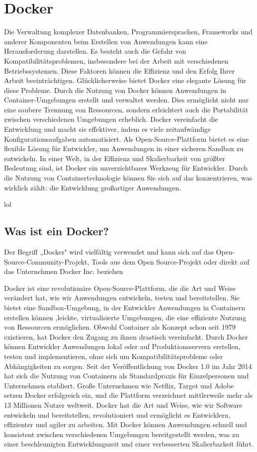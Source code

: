 \section{Docker}\label{Docker}

Die Verwaltung komplexer Datenbanken, Programmiersprachen, Frameworks und anderer Komponenten beim Erstellen von Anwendungen kann eine Herausforderung darstellen. Es besteht auch die Gefahr von Kompatibilitätsproblemen, insbesondere bei der Arbeit mit verschiedenen Betriebssystemen. Diese Faktoren können die Effizienz und den Erfolg Ihrer Arbeit beeinträchtigen.
Glücklicherweise bietet Docker eine elegante Lösung für diese Probleme. Durch die Nutzung von Docker können Anwendungen in Container-Umgebungen erstellt und verwaltet werden. Dies ermöglicht nicht nur eine saubere Trennung von Ressourcen, sondern erleichtert auch die Portabilität zwischen verschiedenen Umgebungen erheblich.
Docker vereinfacht die Entwicklung und macht sie effektiver, indem es viele zeitaufwändige Konfigurationsaufgaben automatisiert. Als Open-Source-Plattform bietet es eine flexible Lösung für Entwickler, um Anwendungen in einer sicheren Sandbox zu entwickeln.
In einer Welt, in der Effizienz und Skalierbarkeit von größter Bedeutung sind, ist Docker ein unverzichtbares Werkzeug für Entwickler. Durch die Nutzung von Containertechnologie können Sie sich auf das konzentrieren, was wirklich zählt: die Entwicklung großartiger Anwendungen.

lol
\subsection{Was ist ein Docker?}

Der Begriff „Docker" wird vielfältig verwendet und kann sich auf das Open-Source-Community-Projekt, Tools aus dem Open Source-Projekt oder direkt auf das Unternehmen Docker Inc. beziehen

Docker ist eine revolutionäre Open-Source-Plattform, die die Art und Weise verändert hat, wie wir Anwendungen entwickeln, testen und bereitstellen. Sie bietet eine Sandbox-Umgebung, in der Entwickler Anwendungen in Containern erstellen können ,leichte, virtualisierte Umgebungen, die eine effiziente Nutzung von Ressourcen ermöglichen. 
Obwohl Container als Konzept schon seit 1979 existieren, hat Docker den Zugang zu ihnen drastisch vereinfacht. Durch Docker können Entwickler Anwendungen lokal oder auf Produktionsservern erstellen, testen und implementieren, ohne sich um Kompatibilitätsprobleme oder Abhängigkeiten zu sorgen.
Seit der Veröffentlichung von Docker 1.0 im Jahr 2014 hat sich die Nutzung von Containern als Standardpraxis für Einzelpersonen und Unternehmen etabliert. Große Unternehmen wie Netflix, Target und Adobe setzen Docker erfolgreich ein, und die Plattform verzeichnet mittlerweile mehr als 13 Millionen Nutzer weltweit. 
Docker hat die Art und Weise, wie wir Software entwickeln und bereitstellen, revolutioniert und ermöglicht es Entwicklern, effizienter und agiler zu arbeiten. Mit Docker können Anwendungen schnell und konsistent zwischen verschiedenen Umgebungen bereitgestellt werden, was zu einer beschleunigten Entwicklungszeit und einer verbesserten Skalierbarkeit führt. 

